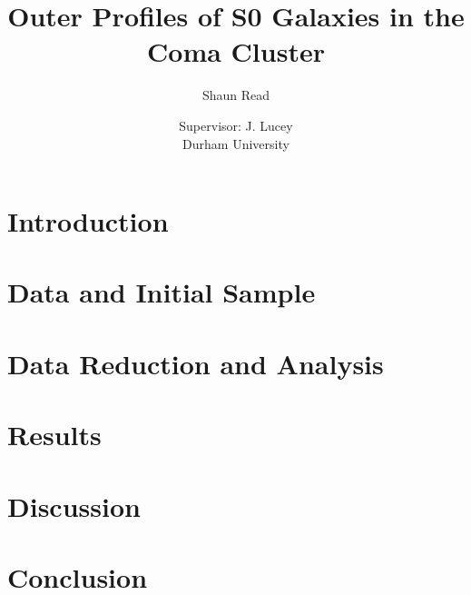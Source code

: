 \documentclass[12pt, preprint]{aastex}
\begin{document}
\title{Outer Profiles of S0 Galaxies in the Coma Cluster}
\author{Shaun Read}
\author{Supervisor: J. Lucey\\ Durham University}

\begin{abstract}
	
\end{abstract}
\tableofcontents

\section{Introduction}
	
\section{Data and Initial Sample}
	
\section{Data Reduction and Analysis}
	
\section{Results}
	
\section{Discussion}
	
\section{Conclusion}
	


\end{document}
